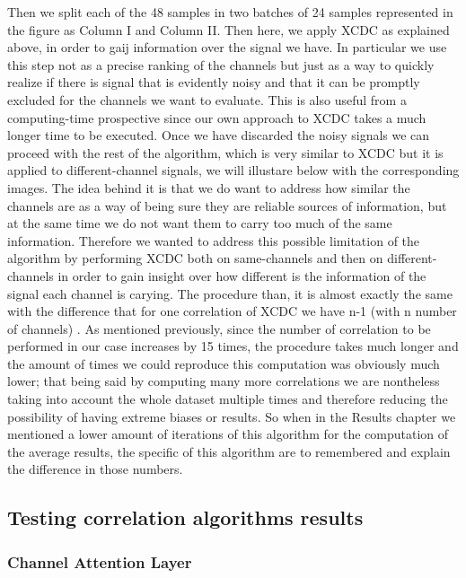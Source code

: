 \documentclass{Configuration_Files/PoliMi3i_thesis}
\begin{document}
Then we split each of the 48 samples in two batches of 24 samples represented in the figure as Column I and Column II.
Then here, we apply XCDC as explained above, in order to gaij information over the signal we have.
In particular we use this step not as a precise ranking of the channels but just as a way to quickly realize if there is signal that is evidently noisy and that it can be promptly excluded for the channels we want to evaluate.
This is also useful from a computing-time prospective since our own approach to XCDC takes a much longer time to be executed.
Once we have discarded the noisy signals we can proceed with the rest of the algorithm, which is very similar to XCDC but it is applied to different-channel signals, we will illustare below with the corresponding images.
The idea behind it is that we do want to address how similar the channels are as a way of being sure they are reliable sources of information, but at the same time we do not want them to carry too much of the same information.
Therefore we wanted to address this possible limitation of the algorithm by performing XCDC both on same-channels and then on different-channels in order to gain insight over how different is the information of the signal each channel is carying.
The procedure than, it is almost exactly the same with the difference that for one correlation of XCDC we have n-1 (with n number of channels) .
As mentioned previously, since the number of correlation to be performed in our case increases by 15 times, the procedure takes much longer and the amount of times we could reproduce this computation was obviously much lower; that being said by computing many more correlations we are nontheless taking into account the whole dataset multiple times and therefore reducing the possibility of having extreme biases or results.
So when in the Results chapter we mentioned a lower amount of iterations of this algorithm for the computation of the average results, the specific of this algorithm are to remembered and explain the difference in those numbers.




\subsection{Testing correlation algorithms results}

\subsubsection{Channel Attention Layer}
\end{document}
